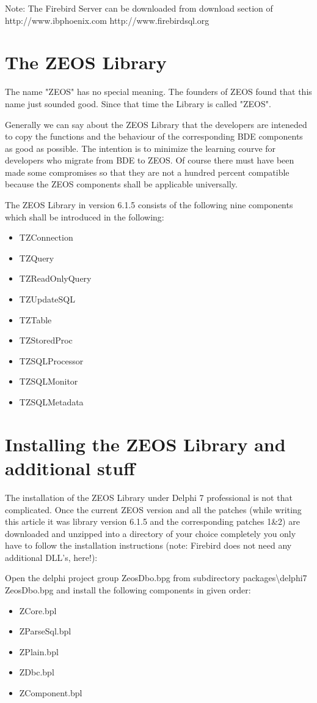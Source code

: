 \documentclass[a4paper,12pt,oneside]{book}
\begin{document}
Note: The Firebird Server can be downloaded from download section of
http://www.ibphoenix.com
http://www.firebirdsql.org

\section{The ZEOS Library}
The name "ZEOS" has no special meaning. The founders of ZEOS found that this name just sounded good.
Since that time the Library is called "ZEOS".

Generally we can say about the ZEOS Library that the developers are inteneded to
copy the functions and the behaviour of the corresponding BDE components as good
as possible.
The intention is to minimize the learning courve for developers who
migrate from BDE to ZEOS.
Of course there must have been made some compromises so that they are not a hundred percent compatible because the ZEOS components shall be applicable universally.

The ZEOS Library in version 6.1.5 consists of the following nine components
which shall be introduced in the following:
\begin{itemize}
\item TZConnection
\item TZQuery
\item TZReadOnlyQuery
\item TZUpdateSQL
\item TZTable
\item TZStoredProc
\item TZSQLProcessor
\item TZSQLMonitor
\item TZSQLMetadata
\end{itemize}

\section{Installing the ZEOS Library and additional stuff}

The installation of the ZEOS Library under Delphi 7 professional is not that complicated.
Once the current ZEOS version and all the patches (while writing this article it was library version 6.1.5 and the corresponding patches 1\&2) are downloaded and unzipped into a directory of your choice completely you only have to follow the installation instructions (note: Firebird does not need any additional DLL's, here!):

Open the delphi project group ZeosDbo.bpg from subdirectory packages\textbackslash delphi7 ZeosDbo.bpg and install
the following components in given order:
\begin{itemize}
\item ZCore.bpl
\item ZParseSql.bpl
\item ZPlain.bpl
\item ZDbc.bpl
\item ZComponent.bpl
\end{itemize}
\end{document}
